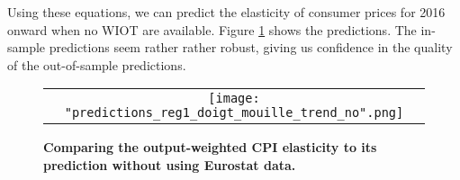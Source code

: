 \documentclass[11pt,a4paper]{article}
\begin{document}
Using these equations, we can predict the elasticity of consumer prices for 2016 onward when no WIOT are available. Figure \ref{fig:panel_pred3} shows the predictions. The in-sample predictions seem rather rather robust, giving us confidence in the quality of the out-of-sample predictions.


\begin{figure}[!h]
	\centering
	\caption{\footnotesize{\textbf{Comparing the output-weighted CPI elasticity to its prediction without using Eurostat data.}}}
	\begin{tabular}{c}
		\texttt{[image: "predictions\_reg1\_doigt\_mouille\_trend\_no".png]}\\
	\end{tabular}
	\label{fig:panel_pred3}
\end{figure}
\end{document}
